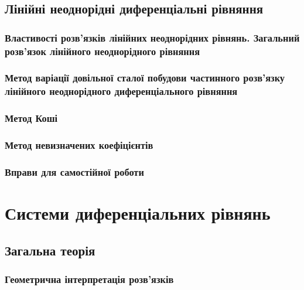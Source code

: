 	\subsection{Лінійні неоднорідні диференціальні рівняння}
	

		\subsubsection{Властивості розв'язків лінійних неоднорідних рівнянь. Загальний розв'язок лінійного неоднорідного рівняння}
		

		\subsubsection{Метод варіації довільної сталої побудови частинного роз\-в'яз\-ку лінійного неоднорідного диференціального рівняння}
		

		\subsubsection{Метод Коші}
		

		\subsubsection{Метод невизначених коефіцієнтів}
		

		\subsubsection{Вправи для самостійної роботи}
		

\section{Системи диференціальних рівнянь}


	\subsection{Загальна теорія}
	

		\subsubsection{Геометрична інтерпретація розв'язків}
		

